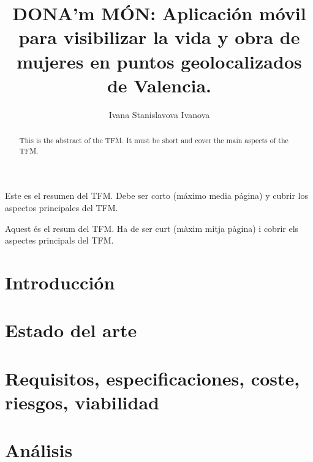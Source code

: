 \documentclass[twoside,spanish,a4paper,12pt]{tfg}
\title{DONA’m MÓN: Aplicación móvil para visibilizar la vida y obra de mujeres en puntos geolocalizados de Valencia.}
\author{Ivana Stanislavova Ivanova}
\begin{document}
\portada
\cleardoublepage
\contraportada
\cleardoublepage
\declaracion
\cleardoublepage


\begin{resumen}
  Este es el resumen del TFM. Debe ser corto (máximo media página) y cubrir los aspectos principales del TFM.
\end{resumen}
\cleardoublepage

\begin{abstract}
  This is the abstract of the TFM. It must be short and cover the main aspects of the TFM.
\end{abstract}
\cleardoublepage

\begin{resum}
  Aquest és el resum del TFM. Ha de ser curt (màxim mitja pàgina) i cobrir els aspectes principals del TFM.
\end{resum}
\cleardoublepage


\begin{agradecimientos}

\end{agradecimientos}
\cleardoublepage

\tableofcontents

\pagestyle{tfg}
\justify



\chapter{Introducción}


\chapter{Estado del arte}


\chapter{Requisitos, especificaciones, coste, riesgos, viabilidad}


\chapter{Análisis}

\end{document}
